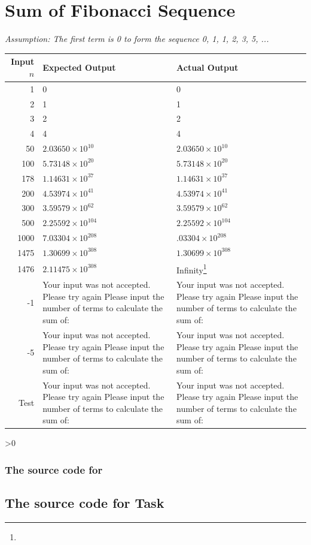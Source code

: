 \documentclass[12pt,a4paper,onesided]{report}
\newcommand{\source}{\pagebreak
	\ifnum\value{section}>0
		\subsection{The source code for \thesection}

	\else
		\section{The source code for Task \thechapter}

	\fi
	}
\begin{document}
\chapter{Sum of Fibonacci Sequence}
\emph{Assumption: The first term is 0 to form the sequence 0, 1, 1, 2, 3, 5, ...}
\begin{table}[h!]
	\centering
	\begin{tabular}{rp{}p{}}
		\toprule
		Input $n$&Expected Output & Actual Output\\\midrule					
		1 & 0 & 0\\
		2 & 1 & 1\\
		3 & 2 & 2\\
		4 & 4 & 4\\
		50&$2.03650\times10^{10}$&$2.03650\times10^{10}$\\
		100& $5.73148\times10^{20}$& $5.73148\times10^{20}$\\
		178& $1.14631\times10^{37}$& $1.14631\times10^{37}$\\
		200& $4.53974\times10^{41}$& $4.53974\times10^{41}$\\
		300& $3.59579\times10^{62}$& $3.59579\times10^{62}$\\
		500& $2.25592\times10^{104}$ & $2.25592\times10^{104}$\\
		1000& $7.03304\times10^{208}$ & $.03304\times10^{208}$\\
		1475& $1.30699\times10^{308}$ & $1.30699\times10^{308}$\\
		1476& $2.11475\times10^{308}$ & Infinity\footnote{} \\
		-1 & Your input was not accepted. Please try again Please input the number of terms to calculate the sum of:  & Your input was not accepted. Please try again Please input the number of terms to calculate the sum of:\\
		-5 & Your input was not accepted. Please try again Please input the number of terms to calculate the sum of:  & Your input was not accepted. Please try again Please input the number of terms to calculate the sum of:\\
		Test & Your input was not accepted. Please try again Please input the number of terms to calculate the sum of:  & Your input was not accepted. Please try again Please input the number of terms to calculate the sum of:\\
		\bottomrule
	\end{tabular}
\end{table}
\source

\end{document}
